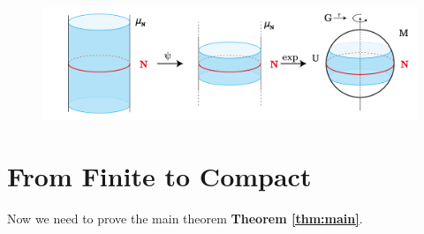 \documentclass[reqno,11pt]{amsart}
\numberwithin{equation}{section}
\theoremstyle{plain}
\theoremstyle{plain}
\numberwithin{equation}{section}
\theoremstyle{remark}
\begin{document}
\begin{figure}[th]
	\centering
	\includegraphics[width=\textwidth]{figures/final3.png}\\
	\caption{}
	\label{fig5}
\end{figure}
\section{From Finite to Compact}
Now we need to prove the main theorem \textbf{Theorem \ref{thm:main}}.
\end{document}
